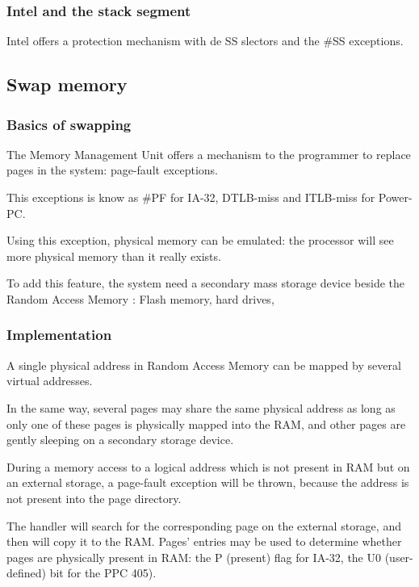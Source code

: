 
\begin{frame}
  \frametitle{Intel and the stack segment}

Intel offers a protection mechanism with de SS slectors and the \#SS exceptions.

\end{frame}


\subsection{Swap memory}

\begin{frame}
  \frametitle{Basics of swapping}

The Memory Management Unit offers a mechanism to the programmer to replace pages in the system: page-fault exceptions.

\-

This exceptions is know as \#PF for IA-32, DTLB-miss and ITLB-miss for Power-PC\etc{}.

\-

 Using this exception, physical memory can be emulated: the processor will see more physical memory than it really exists.

\-

To add this feature, the system need a secondary mass storage device beside the Random Access Memory : Flash memory, hard drives, \etc{}

\end{frame}


\begin{frame}
  \frametitle{Implementation}

A single physical address in Random Access Memory can be mapped by several virtual addresses.

\-

In the same way, several pages may share the same physical address as long as only one of these pages is physically mapped into the RAM, and other pages are gently sleeping on a secondary storage device.

\-

During a memory access to a logical address which is not present in RAM but on an external storage, a page-fault exception will be thrown, because the address is not present into the page directory.

\-

The handler will search for the corresponding page on the external storage, and then will copy it to the RAM. Pages' entries may be used to determine whether pages are physically present in RAM: the P (present) flag for IA-32, the U0 (user-defined) bit for the PPC 405).

\end{frame}

